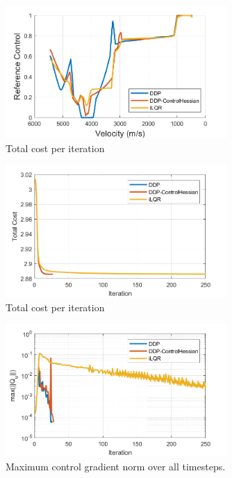 \begin{figure}[h!]
	\centering
	\includegraphics[width=0.75\textwidth]{Images/Convergence/ControlProfiles}
	\caption{Total cost per iteration}
	\label{Fig:ConvergeControls}
\end{figure}
\begin{figure}[h!]
	\centering
	\includegraphics[width=0.75\textwidth]{Images/Convergence/cost}
	\caption{Total cost per iteration}
	\label{Fig:ConvergeCost}
\end{figure}
\begin{figure}[h!]
	\centering
	\includegraphics[width=0.75\textwidth]{Images/Convergence/grad_norm}
	\caption{Maximum control gradient norm over all timesteps.}
	\label{Fig:ConvergeGradient}
\end{figure}
